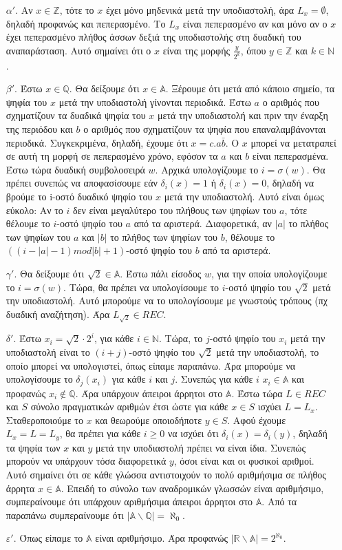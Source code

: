 \documentclass[a4paper, oneside, 11pt]{article}
\theoremstyle{definition}
\begin{document}
\begin{enumerate}
\item[$\alpha'$.] Αν $x\in \mathbb{Z}$, τότε το $x$ έχει μόνο μηδενικά μετά την υποδιαστολή, άρα $L_x=\emptyset$,
δηλαδή προφανώς και πεπερασμένο. Το $L_x$ είναι πεπερασμένο αν και μόνο αν ο $x$ έχει πεπερασμένο
πλήθος άσσων δεξιά της υποδιαστολής στη δυαδική του αναπαράσταση. Αυτό σημαίνει ότι ο $x$ είναι της
μορφής $\frac{y}{2^k}$, όπου $y\in \mathbb{Z}$ και $k\in \mathbb{N}$.

\item[$\beta'$.] Έστω $x\in \mathbb{Q}$. Θα δείξουμε ότι $x\in \mathbb{A}$. Ξέρουμε ότι μετά από κάποιο σημείο,
τα ψηφία του $x$ μετά την υποδιαστολή γίνονται περιοδικά. Έστω $a$ ο αριθμός που σχηματίζουν τα
δυαδικά ψηφία του $x$ μετά την υποδιαστολή και πριν την έναρξη της περιόδου και $b$ ο αριθμός που
σχηματίζουν τα ψηφία που επαναλαμβάνονται περιοδικά. Συγκεκριμένα, δηλαδή, έχουμε ότι
$x=c.a\bar{b}$. Ο $x$ μπορεί να μετατραπεί σε αυτή τη μορφή σε πεπερασμένο χρόνο, εφόσον τα $a$ και
$b$ είναι πεπερασμένα. Έστω τώρα δυαδική συμβολοσειρά $w$. Αρχικά υπολογίζουμε το $i=\sigma(w)$. 
Θα πρέπει συνεπώς να αποφασίσουμε εάν $\delta_i (x)=1$ ή $\delta_i (x)=0$, δηλαδή να βρούμε το 
i-οστό δυαδικό ψηφίο του $x$ μετά την υποδιαστολή. Αυτό είναι όμως εύκολο: Αν το $i$ δεν είναι μεγαλύτερο
του πλήθους των ψηφίων του $a$, τότε θέλουμε το $i$-οστό ψηφίο του $a$ από τα αριστερά. Διαφορετικά,
αν $|a|$ το πλήθος των ψηφίων του $a$ και $|b|$ το πλήθος των ψηφίων του $b$, θέλουμε το 
$((i-|a|-1) mod |b| + 1)$-οστό ψηφίο του $b$ από τα αριστερά. 

\item[$\gamma'$.] Θα δείξουμε ότι $\sqrt{2}\in \mathbb{A}$. Έστω πάλι είσοδος $w$, για την οποία υπολογίζουμε το 
$i=\sigma(w)$. Τώρα, θα πρέπει να υπολογίσουμε το $i$-οστό ψηφίο του $\sqrt{2}$ μετά την υποδιαστολή.
Αυτό μπορούμε να το υπολογίσουμε με γνωστούς τρόπους (πχ δυαδική αναζήτηση). Άρα $L_{\sqrt{2}}\in REC$.

\item[$\delta'$.] Έστω $x_i=\sqrt{2}\cdot 2^i$, για κάθε $i\in \mathbb{N}$. Τώρα, το $j$-οστό ψηφίο του $x_i$ μετά την
υποδιαστολή είναι το $(i+j)$-οστό ψηφίο του $\sqrt{2}$ μετά την υποδιαστολή, το οποίο μπορεί να υπολογιστεί,
όπως είπαμε παραπάνω. Άρα μπορούμε να υπολογίσουμε το $\delta_j(x_i)$ για κάθε $i$ και $j$. Συνεπώς για κάθε
$i$ $x_i\in \mathbb{A}$ και προφανώς $x_i\notin \mathbb{Q}$. Άρα υπάρχουν άπειροι άρρητοι στο $\mathbb{A}$.
Έστω τώρα $L\in REC$ και $S$ σύνολο πραγματικών αριθμών έτσι ώστε για κάθε $x\in S$ ισχύει $L=L_x$. 
Σταθεροποιούμε το $x$ και θεωρούμε οποιοδήποτε $y\in S$. Αφού έχουμε $L_x=L=L_y$, θα πρέπει για κάθε $i\geq 0$
να ισχύει ότι $\delta_i(x)=\delta_i(y)$, δηλαδή τα ψηφία των $x$ και $y$ μετά την υποδιαστολή πρέπει να είναι
ίδια. Συνεπώς μπορούν να υπάρχουν τόσα διαφορετικά $y$, όσοι είναι και οι φυσικοί αριθμοί. Αυτό σημαίνει ότι
σε κάθε γλώσσα αντιστοιχούν το πολύ αριθμήσιμα σε πλήθος άρρητα $x\in \mathbb{A}$. Επειδή το σύνολο των
αναδρομικών γλωσσών είναι αριθμήσιμο, συμπεραίνουμε ότι υπάρχουν αριθμήσιμα άπειροι άρρητοι στο $\mathbb{A}$.
Από τα παραπάνω συμπεραίνουμε ότι $|\mathbb{A}\backslash\mathbb{Q}|=\aleph_0$.

\item[$\varepsilon'$.] Όπως είπαμε το $\mathbb{A}$ είναι αριθμήσιμο. Άρα προφανώς $|\mathbb{R}\backslash\mathbb{A}|=2^{\aleph_0}$.
\end{enumerate}
\end{document}
